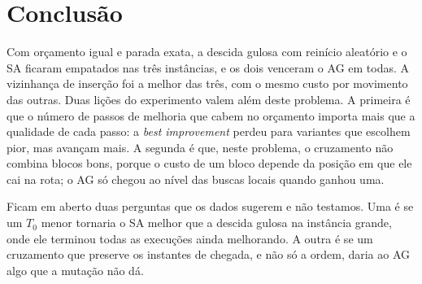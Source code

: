 \section{Conclusão}
\label{sec:conclusao}

Com orçamento igual e parada exata, a descida gulosa com reinício aleatório e o SA ficaram empatados nas três instâncias, e os dois venceram o AG em todas.
A vizinhança de inserção foi a melhor das três, com o mesmo custo por movimento das outras.
Duas lições do experimento valem além deste problema.
A primeira é que o número de passos de melhoria que cabem no orçamento importa mais que a qualidade de cada passo: a \textit{best improvement} perdeu para variantes que escolhem pior, mas avançam mais.
A segunda é que, neste problema, o cruzamento não combina blocos bons, porque o custo de um bloco depende da posição em que ele cai na rota; o AG só chegou ao nível das buscas locais quando ganhou uma.

Ficam em aberto duas perguntas que os dados sugerem e não testamos.
Uma é se um $T_0$ menor tornaria o SA melhor que a descida gulosa na instância grande, onde ele terminou todas as execuções ainda melhorando.
A outra é se um cruzamento que preserve os instantes de chegada, e não só a ordem, daria ao AG algo que a mutação não dá.
